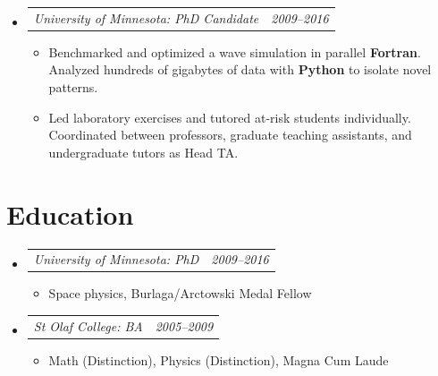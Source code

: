 \documentclass[12pt,letterpaper]{article}
\makeatletter
\newcommand{\headerpair}[2]{
    \begin{tabular*}{\linewidth}{l@{ \extracolsep{\fill} }r} {\large\emph{#1}} & {\large\emph{#2}}
    \end{tabular*}
}
\newcommand{\headerrow}[3]{\headerpair{#2: #1}{#3}}
\newcommand{\ResumeSection}[1]{\section*{{\color{MidnightBlue}#1 \sout{\hfill}}}}
\makeatother
\begin{document}
\begin{itemize}[leftmargin=\parindent]
\begin{itemize}[leftmargin=\parindent]


        \end{itemize}

    \item[]
        \headerrow
            {PhD Candidate}
            {University of Minnesota}
            {2009--2016}
        \begin{itemize}[leftmargin=\parindent]
            \item Benchmarked and optimized a wave simulation in parallel \textbf{Fortran}. Analyzed hundreds of gigabytes of data with \textbf{Python} to isolate novel patterns.

            \item Led laboratory exercises and tutored at-risk students individually. Coordinated between professors, graduate teaching assistants, and undergraduate tutors as Head TA.
        \end{itemize}

\end{itemize}

\ResumeSection{Education}

\begin{itemize}[leftmargin=\parindent]
    \parskip=0.1em
    \itemsep=1.2em

    \item[]
        \headerrow
            {PhD}
            {University of Minnesota}
            {2009--2016}
        \begin{itemize}[leftmargin=\parindent]
            \item Space physics, Burlaga/Arctowski Medal Fellow
        \end{itemize}
    \item[]
        \headerrow
            {BA}
            {St Olaf College}
            {2005--2009}
        \begin{itemize}[leftmargin=\parindent]
            \item Math (Distinction), Physics (Distinction),
                 Magna Cum Laude
        \end{itemize}
\end{itemize}
\end{document}
